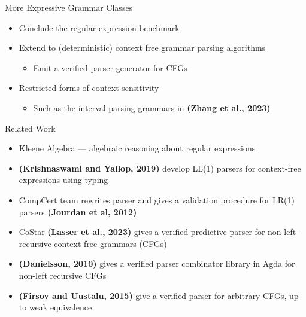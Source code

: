 \documentclass[10pt]{beamer}
\begin{document}
\begin{frame}{More Expressive Grammar Classes}
  \begin{itemize}
    \item<1-> Conclude the regular expression benchmark
    \item<2-> Extend to (deterministic) context free grammar parsing algorithms
        \begin{itemize}
          \item<3-> Emit a verified parser generator for CFGs
        \end{itemize}
    \item<4-> Restricted forms of context sensitivity
        \begin{itemize}
          \item<5-> Such as the interval parsing grammars in \textbf{(Zhang et al., 2023)}
        \end{itemize}
  \end{itemize}
\end{frame}

\begin{frame}{Related Work}
  \begin{itemize}
    \item Kleene Algebra --- algebraic reasoning about regular expressions
    \item<2-> \textbf{(Krishnaswami and Yallop, 2019)} develop LL(1) parsers for context-free expressions using typing
  \end{itemize}

  \begin{itemize}
    \item<3-> CompCert team rewrites parser and gives a validation procedure for LR(1) parsers \textbf{(Jourdan et al, 2012)}
    \item<4-> CoStar \textbf{(Lasser et al., 2023)} gives a verified predictive
          parser for non-left-recursive context free grammars (CFGs)
    \item<5-> \textbf{(Danielsson, 2010)} gives a verified parser combinator library
          in Agda for non-left recursive CFGs
    \item<6-> \textbf{(Firsov and Uustalu, 2015)} give a verified parser for arbitrary CFGs, up to weak equivalence
  \end{itemize}
\end{frame}
\end{document}
